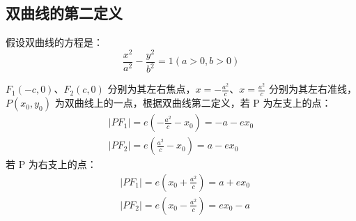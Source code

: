 \subsection{双曲线的第二定义}

\begin{definition}[双曲线的第二定义]

\end{definition}

\begin{theorem}[双曲线的焦半径公式]
    假设双曲线的方程是：
    $$
        \frac{x^2}{a^2}-\frac{y^2}{b^2}=1(a>0, b>0)
    $$

    $F_1(-c, 0) $、$ F_2(c, 0)$ 分别为其左右焦点，$x=-\frac{a^2}{c}$、$x=\frac{a^2}{c}$ 分别为其左右准线， $P\left(x_0, y_0\right)$ 为双曲线上的一点，根据双曲线第二定义，若 P 为左支上的点：
    $$
        \begin{gathered}
            \left|P F_1\right|=e\left(-\frac{a^2}{c}-x_0\right)=-a-e x_0 \\
            \left|P F_2\right|=e\left(\frac{a^2}{c}-x_0\right)=a-e x_0
        \end{gathered}
    $$
    若 P 为右支上的点：
    $$
        \begin{aligned}
             & \left|P F_1\right|=e\left(x_0+\frac{a^2}{c}\right)=a+e x_0 \\
             & \left|P F_2\right|=e\left(x_0-\frac{a^2}{c}\right)=e x_0-a
        \end{aligned}
    $$
\end{theorem}
